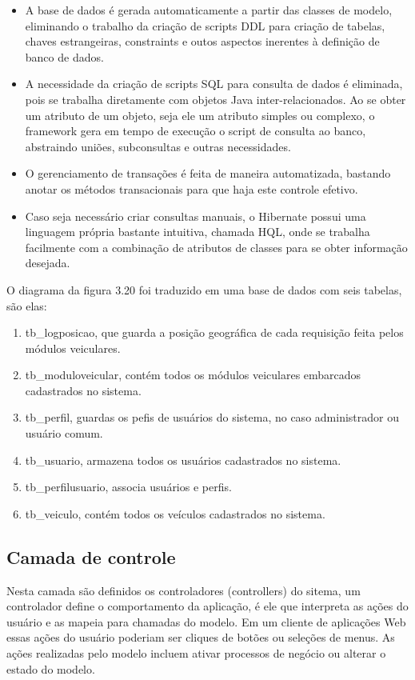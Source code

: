 \begin{itemize}
	\item A base de dados é gerada automaticamente a partir das classes de modelo, eliminando o trabalho da criação de scripts DDL para criação de tabelas, chaves estrangeiras, constraints e outos aspectos inerentes à definição de banco de dados.
	\item A necessidade da criação de scripts SQL para consulta de dados é eliminada, pois se trabalha diretamente com objetos Java inter-relacionados. Ao se obter um atributo de um objeto, seja ele um atributo simples ou complexo, o framework gera em tempo de execução o script de consulta ao banco, abstraindo uniões, subconsultas e outras necessidades.
	\item O gerenciamento de transações é feita de maneira automatizada, bastando anotar os métodos transacionais para que haja este controle efetivo.
	\item Caso seja necessário criar consultas manuais, o Hibernate possui uma linguagem própria bastante intuitiva, chamada HQL, onde se trabalha facilmente com a combinação de atributos de classes para se obter informação desejada. 
\end{itemize}

O diagrama da figura 3.20 foi traduzido em uma base de dados com seis tabelas, são elas:

\begin{enumerate}
	\item tb\_logposicao, que guarda a posição geográfica de cada requisição feita pelos módulos veiculares.
	\item tb\_moduloveicular, contém todos os módulos veiculares embarcados cadastrados no sistema.
	\item tb\_perfil, guardas os pefis de usuários do sistema, no caso administrador ou usuário comum.
	\item tb\_usuario, armazena todos os usuários cadastrados no sistema.
	\item tb\_perfilusuario, associa usuários e perfis.
	\item tb\_veiculo, contém todos os veículos cadastrados no sistema.
\end{enumerate}

\subsection{Camada de controle}

Nesta camada são definidos os controladores (controllers) do sitema, um controlador define o comportamento da aplicação, é ele que interpreta as ações do usuário e as mapeia para chamadas do modelo. Em um cliente de aplicações Web essas ações do usuário poderiam ser cliques de botões ou seleções de menus. As ações realizadas pelo modelo incluem ativar processos de negócio ou alterar o estado do modelo.

